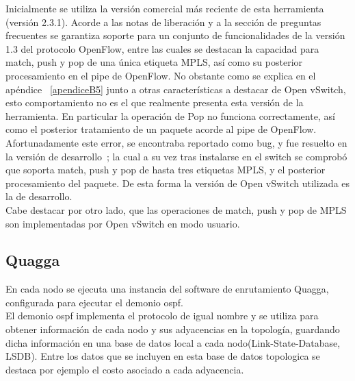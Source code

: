 Inicialmente se utiliza la versi\'on comercial m\'as reciente de esta herramienta (versi\'on 2.3.1). Acorde a las notas de liberaci\'on y a la secci\'on de preguntas frecuentes se garantiza soporte para un conjunto de funcionalidades de la versi\'on 1.3 del protocolo OpenFlow, entre las cuales se destacan la capacidad para match, push y pop de una \'unica etiqueta MPLS, así como su posterior procesamiento en el pipe de OpenFlow. No obstante como se explica en el apéndice ~\ref{apendiceB5} junto a otras características a destacar de Open vSwitch, esto comportamiento no es el que realmente presenta esta versi\'on de la herramienta. En particular la operación de Pop no funciona correctamente, así como el posterior tratamiento de un paquete acorde al pipe de OpenFlow.\\ 

Afortunadamente este error, se encontraba reportado como bug, y fue resuelto en la versi\'on de desarrollo~\citep{OVSSourceCode}; la cual a su vez tras instalarse en el switch se comprobó que soporta match, push y pop de hasta tres etiquetas MPLS, y el posterior procesamiento del paquete. De esta forma la versi\'on de Open vSwitch utilizada es la de desarrollo.\\

Cabe destacar por otro lado, que las operaciones de match, push y pop de MPLS son implementadas por Open vSwitch en modo usuario.


\subsection{Quagga}
En cada nodo se ejecuta una instancia del software de enrutamiento Quagga, configurada para ejecutar el demonio ospf.\\ 

El demonio ospf implementa el protocolo de igual nombre y se utiliza para obtener información de cada nodo y sus adyacencias en la topolog\'ia, guardando dicha información en una base de datos local a cada nodo(Link-State-Database, LSDB). Entre los datos que se incluyen en esta base de datos topologica se destaca por ejemplo el costo asociado a cada adyacencia.\\ 


